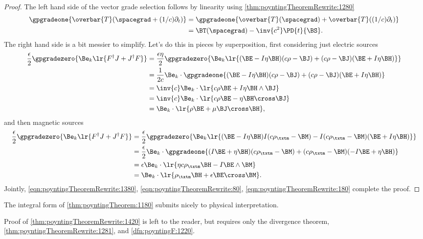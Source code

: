 \begin{proof}
The left hand side of the vector grade selection follows by linearity using \cref{thm:poyntingTheoremRewrite:1280}
\begin{equation}\label{eqn:poyntingTheoremRewrite:1380}
\begin{aligned}
\gpgradeone{ \overbar{T}(\spacegrad + (1/c)\partial_t) }
&= \gpgradeone{ \overbar{T}(\spacegrad) + \overbar{T}((1/c)\partial_t) } \\
&= \BT(\spacegrad) - \inv{c^2} \PD{t}{\BS}.
\end{aligned}
\end{equation}
The right hand side is a bit messier to simplify.
Let's do this in pieces by superposition, first considering just electric sources
\begin{equation}\label{eqn:poyntingTheoremRewrite:80}
\begin{aligned}
\frac{\epsilon}{2} \gpgradezero{ \Be_k \lr{ F^\dagger J + J^\dagger F} }
&= \frac{\epsilon \eta}{2} \gpgradezero{ \Be_k \lr{ (\BE - I \eta \BH)(c \rho - \BJ)  + (c \rho - \BJ)( \BE + I \eta \BH )} } \\
&= \frac{1}{2c } \Be_k \cdot \gpgradeone{ (\BE - I \eta \BH)(c \rho - \BJ)  + (c \rho - \BJ)( \BE + I \eta \BH ) } \\
&= \inv{c} \Be_k \cdot \lr{ c \rho \BE + I \eta \BH \wedge \BJ } \\
&= \inv{c} \Be_k \cdot \lr{ c \rho \BE - \eta \BH \cross \BJ } \\
&= \Be_k \cdot \lr{ \rho \BE + \mu \BJ \cross \BH },
\end{aligned}
\end{equation}
and then magnetic sources
\begin{equation}\label{eqn:poyntingTheoremRewrite:180}
\begin{aligned}
\frac{\epsilon}{2 } \gpgradezero{ \Be_k \lr{ F^\dagger J + J^\dagger F} }
&= \frac{\epsilon }{2} \gpgradezero{ \Be_k \lr{ (\BE - I \eta \BH) I (c \rho_\txtm - \BM)  - I (c \rho_\txtm - \BM)( \BE + I \eta \BH )} } \\
&= \frac{\epsilon }{2} \Be_k \cdot \gpgradeone{ (I \BE + \eta \BH)(c \rho_\txtm - \BM)  + (c \rho_\txtm - \BM)( -I \BE + \eta \BH )} \\
&= \epsilon \Be_k \cdot \lr{ \eta c \rho_\txtm \BH - I \BE \wedge \BM } \\
&= \Be_k \cdot \lr{ \rho_\txtm \BH + \epsilon \BE \cross \BM }.
\end{aligned}
\end{equation}
Jointly,
\cref{eqn:poyntingTheoremRewrite:1380}, \cref{eqn:poyntingTheoremRewrite:80}, \cref{eqn:poyntingTheoremRewrite:180} complete the proof.
\end{proof}
The integral form of \cref{thm:poyntingTheorem:1180} submits nicely to physical interpretation.

Proof of
\cref{thm:poyntingTheoremRewrite:1420}
is left to the reader, but
requires only the divergence theorem, \cref{thm:poyntingTheoremRewrite:1281}, and
\cref{dfn:poyntingF:1220}.

